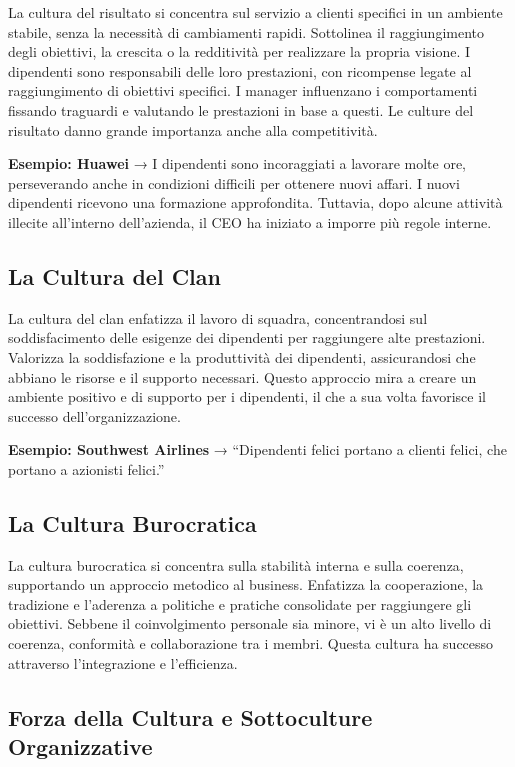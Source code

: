 \documentclass{article}
\begin{document}
La cultura del risultato si concentra sul servizio a clienti specifici in un ambiente stabile, senza la necessità di cambiamenti rapidi. Sottolinea il raggiungimento degli obiettivi, la crescita o la redditività per realizzare la propria visione. I dipendenti sono responsabili delle loro prestazioni, con ricompense legate al raggiungimento di obiettivi specifici. I manager influenzano i comportamenti fissando traguardi e valutando le prestazioni in base a questi. Le culture del risultato danno grande importanza anche alla competitività.

\textbf{Esempio: Huawei} → I dipendenti sono incoraggiati a lavorare molte ore, perseverando anche in condizioni difficili per ottenere nuovi affari. I nuovi dipendenti ricevono una formazione approfondita. Tuttavia, dopo alcune attività illecite all'interno dell'azienda, il CEO ha iniziato a imporre più regole interne.

\subsection{La Cultura del Clan}

La cultura del clan enfatizza il lavoro di squadra, concentrandosi sul soddisfacimento delle esigenze dei dipendenti per raggiungere alte prestazioni. Valorizza la soddisfazione e la produttività dei dipendenti, assicurandosi che abbiano le risorse e il supporto necessari. Questo approccio mira a creare un ambiente positivo e di supporto per i dipendenti, il che a sua volta favorisce il successo dell'organizzazione.

\textbf{Esempio: Southwest Airlines} → “Dipendenti felici portano a clienti felici, che portano a azionisti felici.”

\subsection{La Cultura Burocratica}

La cultura burocratica si concentra sulla stabilità interna e sulla coerenza, supportando un approccio metodico al business. Enfatizza la cooperazione, la tradizione e l'aderenza a politiche e pratiche consolidate per raggiungere gli obiettivi. Sebbene il coinvolgimento personale sia minore, vi è un alto livello di coerenza, conformità e collaborazione tra i membri. Questa cultura ha successo attraverso l'integrazione e l'efficienza.

\subsection{Forza della Cultura e Sottoculture Organizzative}
\end{document}
